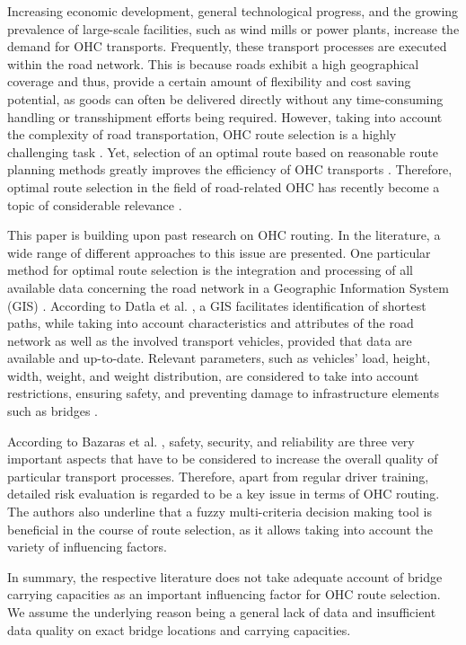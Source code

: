 %

Increasing economic development, general technological progress, and the growing prevalence of large-scale facilities, such as wind mills or power plants, increase the demand for OHC transports.
Frequently, these transport processes are executed within the road network. This is because roads exhibit a high geographical coverage and thus, provide a certain amount of flexibility and cost saving potential, as goods can often be delivered directly without any time-consuming handling or transshipment efforts being required. However, taking into account the complexity of road transportation, OHC route selection is a highly challenging task \cite{Bazaras.2013, xu2001methodology, sivilevicius2007dynamics}.
Yet, selection of an optimal route based on reasonable route planning methods greatly improves the efficiency of OHC transports \cite{meng2015optimized}.
Therefore, optimal route selection in the field of road-related OHC has recently become a topic of considerable relevance \cite{geisberger2011efficient}.
\par
This paper is building upon past research on OHC routing. In the literature, a wide range of different approaches to this issue are presented.
One particular method for optimal route selection is the integration and processing of all available data concerning the road network in a Geographic Information System (GIS) \cite{durham2002gis}.
According to Datla et al. \cite{datla2004gis}, a GIS facilitates identification of shortest paths, while taking into account characteristics and attributes of the road network as well as the involved transport vehicles, provided that data are available and up-to-date. Relevant parameters, such as vehicles' load, height, width, weight, and weight distribution, are considered to take into account restrictions, ensuring safety, and preventing damage to infrastructure elements such as bridges \cite{ecmt2006improving, vaitkus2016effect, kombe2017modelling, pauer2017development}.
\par
According to Bazaras et al. \cite{Bazaras.2013}, safety, security, and reliability are three very important aspects that have to be considered to increase the overall quality of particular transport processes. Therefore, apart from regular driver training, detailed risk evaluation is regarded to be a key issue in terms of OHC routing. The authors also underline that a fuzzy multi-criteria decision making tool is beneficial in the course of route selection, as it allows taking into account the variety of influencing factors.
\par
In summary, the respective literature does not take adequate account of bridge carrying capacities as an important influencing factor for OHC route selection. We assume the underlying reason being a general lack of data and insufficient data quality on exact bridge locations and carrying capacities.



